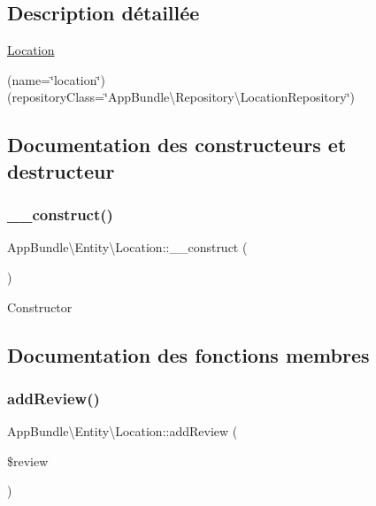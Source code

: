 \subsection{Description détaillée}
\hyperlink{classAppBundle_1_1Entity_1_1Location}{Location}

(name=\char`\"{}location\char`\"{}) (repository\+Class=\char`\"{}\+App\+Bundle\textbackslash{}\+Repository\textbackslash{}\+Location\+Repository\char`\"{}) 

\subsection{Documentation des constructeurs et destructeur}
\mbox{\label{classAppBundle_1_1Entity_1_1Location_aaee06ec64eadc141b27c883faab92552}} 
\subsubsection{\texorpdfstring{\+\_\+\+\_\+construct()}{\_\_construct()}}
{\footnotesize\ttfamily App\+Bundle\textbackslash{}\+Entity\textbackslash{}\+Location\+::\+\_\+\+\_\+construct (\begin{DoxyParamCaption}{ }\end{DoxyParamCaption})}

Constructor 

\subsection{Documentation des fonctions membres}
\mbox{\label{classAppBundle_1_1Entity_1_1Location_a49b47d7c0be25471d81d1ae3e31ba448}} 
\subsubsection{\texorpdfstring{add\+Review()}{addReview()}}
{\footnotesize\ttfamily App\+Bundle\textbackslash{}\+Entity\textbackslash{}\+Location\+::add\+Review (\begin{DoxyParamCaption}\item[{\textbackslash{}\hyperlink{classAppBundle_1_1Entity_1_1Review}{App\+Bundle\textbackslash{}\+Entity\textbackslash{}\+Review}}]{\$review }\end{DoxyParamCaption})}

